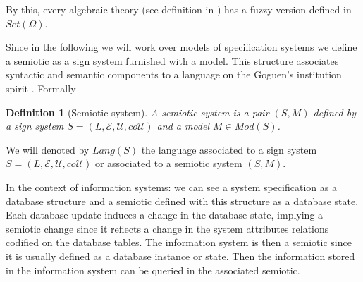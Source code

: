 \documentclass[oribibl]{llncs}
\newtheorem{defn}{Definition}
\newcommand{\E}{\mathcal{E}}
\newcommand{\U}{\mathcal{U}}
\begin{document}
By this, every algebraic theory (see definition in \cite{Adamek94}) has a fuzzy version defined in $Set(\Omega)$.

Since in the following we will work over models of specification systems we define a semiotic as a sign system furnished with a model. This structure associates syntactic and semantic components to a language on the Goguen's  institution spirit \cite{goguen83}. Formally
\begin{defn}[Semiotic system]
A \emph{semiotic system} is a pair $(S,M)$ defined by a sign system
$S=(L,\E,\U,co\U)$ and a model $M\in Mod(S)$.
\end{defn}
We will denoted by $Lang(S)$ the language associated to a sign
system $S=(L,\E,\U,co\U)$ or associated to a semiotic system
$(S,M)$.

In the context of information systems: we can see a system specification as a database structure and a semiotic defined with this structure as a database state. Each database update induces a change in the database state, implying a semiotic change since it reflects a change in the system attributes relations codified on the database tables. The information system is then a semiotic since it is usually defined as a database instance or state. Then the information stored in the information system can be queried in the associated semiotic.
\end{document}
